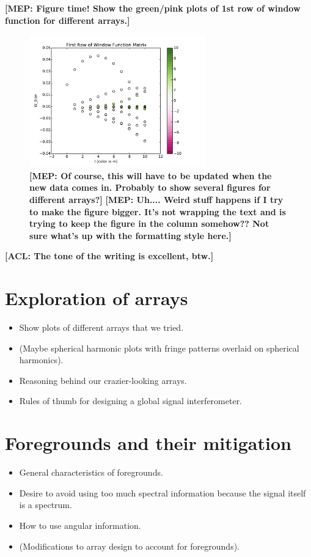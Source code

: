 \documentclass[twolcolumn,apj]{emulateapj}
\newcommand{\acl}[1]{{\color{red} \textbf{[ACL:  #1]}}}
\newcommand{\mep}[1]{{\color{applegreen} \textbf{[MEP:  #1]}}}
\begin{document}
\mep{Figure time! Show the green/pink plots of 1st row of window function for different arrays.}

\begin{figure}[h]
	\centering
	\includegraphics[width=3in]{figures/W_matrix_filler.pdf}
	\caption{\mep{Of course, this will have to be updated when the new data comes in. Probably to show several figures for different arrays?}\mep{Uh.... Weird stuff happens if I try to make the figure bigger. It's not wrapping the text and is trying to keep the figure in the column somehow?? Not sure what's up with the formatting style here.}}
	\label{fig:WindowFunction}
\end{figure}

\acl{The tone of the writing is excellent, btw.}

\section{Exploration of arrays}
\begin{itemize}
\item Show plots of different arrays that we tried.
\item (Maybe spherical harmonic plots with fringe patterns overlaid on spherical harmonics).
\item Reasoning behind our crazier-looking arrays.
\item Rules of thumb for designing a global signal interferometer.
\end{itemize}

\section{Foregrounds and their mitigation}
\begin{itemize}
\item General characteristics of foregrounds.
\item Desire to avoid using too much spectral information because the signal itself is a spectrum.
\item How to use angular information.
\item (Modifications to array design to account for foregrounds).
\end{itemize}
\end{document}
